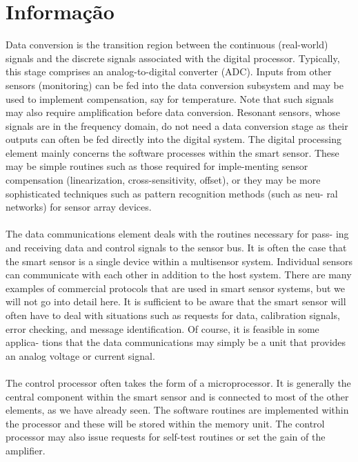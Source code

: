 \section*{Informação}
Data conversion is the transition region between the continuous (real-world)
signals and the discrete signals associated with the digital processor. Typically, this	stage comprises an analog-to-digital converter (ADC). Inputs from other sensors (monitoring) can be fed into the data conversion subsystem and may be used to implement compensation, say for temperature. Note that such signals may also require amplification before data conversion. Resonant sensors, whose signals are in the frequency domain, do not need a data conversion stage as their outputs can often be fed directly into the digital system. The digital processing element mainly concerns the software processes within the smart sensor. These may be simple routines such as those required for imple-menting sensor compensation (linearization, cross-sensitivity, offset), or they may be more sophisticated techniques such as pattern recognition methods (such as neu- ral networks) for sensor array devices.\cite{book-9}
\\
\\
The data communications element deals with the routines necessary for pass-
ing and receiving data and control signals to the sensor bus. It is often the case that the smart sensor is a single device within a multisensor system. Individual sensors can communicate with each other in addition to the host system. There are many examples of commercial protocols that are used in smart sensor systems, but we will not go into detail here. It is sufficient to be aware that the smart sensor will often have to deal with situations such as requests for data, calibration signals, error checking, and message identification. Of course, it is feasible in some applica-
tions that the data communications may simply be a unit that provides an analog voltage or current signal. \cite{book-9}
\\
\\
The control processor often takes the form of a microprocessor. It is generally the central component within the smart sensor and is connected to most of the other elements, as we have already seen. The software routines are implemented within the processor and these will be stored within the memory unit. The control processor may also issue requests for self-test routines or set the gain of the amplifier. \cite{book-9}

